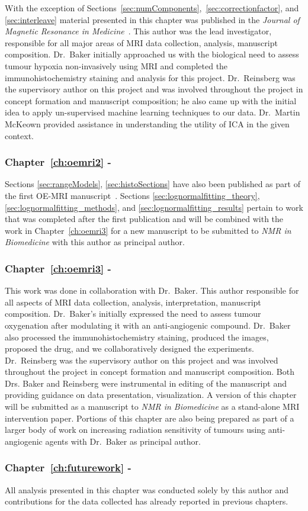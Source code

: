 With the exception of Sections~\ref{sec:numComponents},~\ref{sec:correctionfactor}, and \ref{sec:interleave} material presented in this chapter was published in the \textit{Journal of Magnetic Resonance in Medicine}~\cite{Moosvi:2018ca}. 
This author was the lead investigator, responsible for all major areas of MRI data collection, analysis, manuscript composition. 
Dr.\ Baker initially approached us with the biological need to assess tumour hypoxia non-invasively using MRI and completed the immunohistochemistry staining and analysis for this project. 
Dr.\ Reinsberg was the supervisory author on this project and was involved throughout the project in concept formation and manuscript composition; he also came up with the initial idea to apply un-supervised machine learning techniques to our data. 
Dr.\ Martin McKeown provided assistance in understanding the utility of \ac{ICA} in the given context. 

\subsubsection{Chapter~\ref{ch:oemri2} - }
Sections \ref{sec:rangeModels}, \ref{sec:histoSections} have also been published as part of the first OE-MRI manuscript~\cite{Moosvi:2018ca}.
Sections \ref{sec:lognormalfitting_theory}, \ref{sec:lognormalfitting_methods}, and \ref{sec:lognormalfitting_results} pertain to work that was completed after the first publication and will be combined with the work in Chapter~\ref{ch:oemri3} for a new manuscript to be submitted to \textit{NMR in Biomedicine} with this author as principal author.

\subsubsection{Chapter~\ref{ch:oemri3} - }

This work was done in collaboration with Dr.\ Baker.
This author responsible for all aspects of MRI data collection, analysis, interpretation, manuscript composition. 
Dr.\ Baker's initially expressed the need to assess tumour oxygenation after modulating it with an anti-angiogenic compound.
Dr.\ Baker also processed the immunohistochemistry staining, produced the images, proposed the drug, and we collaboratively designed the experiments. 
Dr.\ Reinsberg was the supervisory author on this project and was involved throughout the project in concept formation and manuscript composition. 
Both Drs. Baker and Reinsberg were instrumental in editing of the manuscript and providing guidance on data presentation, visualization.
A version of this chapter will be submitted as a manuscript to \textit{NMR in Biomedicine} as a stand-alone MRI intervention paper.
Portions of this chapter are also being prepared as part of a larger body of work on increasing radiation sensitivity of tumours using anti-angiogenic agents with Dr.\ Baker as principal author.

\subsubsection{Chapter~\ref{ch:futurework} - }

All analysis presented in this chapter was conducted solely by this author and contributions for the data collected has already reported in previous chapters.
